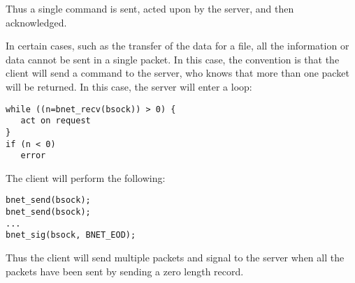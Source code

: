 Thus a single command is sent, acted upon by the server, and then
acknowledged. 

In certain cases, such as the transfer of the data for a file, all the
information or data cannot be sent in a single packet. In this case, the
convention is that the client will send a command to the server, who knows
that more than one packet will be returned. In this case, the server will
enter a loop: 

\footnotesize
\begin{verbatim}
while ((n=bnet_recv(bsock)) > 0) {
   act on request
}
if (n < 0)
   error
\end{verbatim}
\normalsize

The client will perform the following: 

\footnotesize
\begin{verbatim}
bnet_send(bsock);
bnet_send(bsock);
...
bnet_sig(bsock, BNET_EOD);
\end{verbatim}
\normalsize

Thus the client will send multiple packets and signal to the server when all
the packets have been sent by sending a zero length record. 
